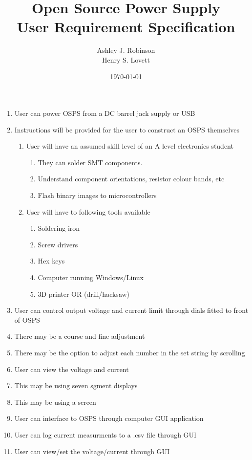 \documentclass[12pt,a4paper]{article}
\title{Open Source Power Supply\\ User Requirement Specification}
\author{Ashley J. Robinson \\ Henry S. Lovett}
\date{\today}
\begin{document}
\maketitle

\begin{enumerate}

\item User can power OSPS from a DC barrel jack supply or USB
\item Instructions will be provided for the user to construct an OSPS themselves
	\begin{enumerate}
	\item User will have an assumed skill level of an A level electronics student
		\begin{enumerate}
		\item They can solder SMT components. 
		\item Understand component orientations, resistor colour bands, etc
		\item Flash binary images to microcontrollers
		\end{enumerate}
	\item User will have to following tools available
		\begin{enumerate}
		\item Soldering iron
		\item Screw drivers
		\item Hex keys
		\item Computer running Windows/Linux
		\item3D printer OR (drill/hacksaw) 
		\end{enumerate}
	\end{enumerate}
\item User can control output voltage and current limit through dials fitted to front of OSPS
\item There may be a course and fine adjustment 
\item There may be the option to adjust each number in the set string by scrolling 
\item User can view the voltage and current
\item This may be using seven sgment displays
\item This may be using a screen
\item User can interface to OSPS through computer GUI application
\item User can log current measurments to a .csv file through GUI
\item User can view/set the voltage/current through GUI
\end{enumerate}
\end{document}
